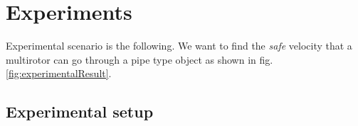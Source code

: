 \documentclass[letterpaper, 10 pt, conference]{ieeeconf}  %
\begin{document}

\section{Experiments}
Experimental scenario is the following. 
We want to find the \textit{safe} velocity that a multirotor can go through a pipe type object as shown in fig. \ref{fig:experimentalResult}.

\subsection{Experimental setup}
\end{document}

